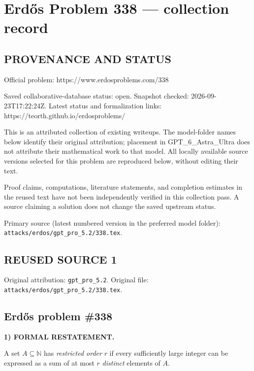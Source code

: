 \section*{Erd\H{o}s Problem 338 --- collection record}

\subsection*{PROVENANCE AND STATUS}
Official problem: https://www.erdosproblems.com/338

Saved collaborative-database status: open.
Snapshot checked: 2026-09-23T17:22:24Z.
Latest status and formalization links: https://teorth.github.io/erdosproblems/

This is an attributed collection of existing writeups. The model-folder names below identify their original attribution; placement in GPT\_6\_Astra\_Ultra does not attribute their mathematical work to that model. All locally available source versions selected for this problem are reproduced below, without editing their text.

Proof claims, computations, literature statements, and completion estimates in the reused text have not been independently verified in this collection pass. A source claiming a solution does not change the saved upstream status.

Primary source (latest numbered version in the preferred model folder): \texttt{attacks/erdos/gpt\_pro\_5.2/338.tex}.

\subsection*{REUSED SOURCE 1}
Original attribution: \texttt{gpt\_pro\_5.2}.
Original file: \texttt{attacks/erdos/gpt\_pro\_5.2/338.tex}.

\subsection*{Erd\H{o}s problem \#338}

\noindent\textbf{1) FORMAL RESTATEMENT.}

A set $A\subseteq\mathbb{N}$ has \emph{restricted order} $r$ if every sufficiently large integer can be expressed as a sum of at most $r$ \emph{distinct} elements of $A$.

